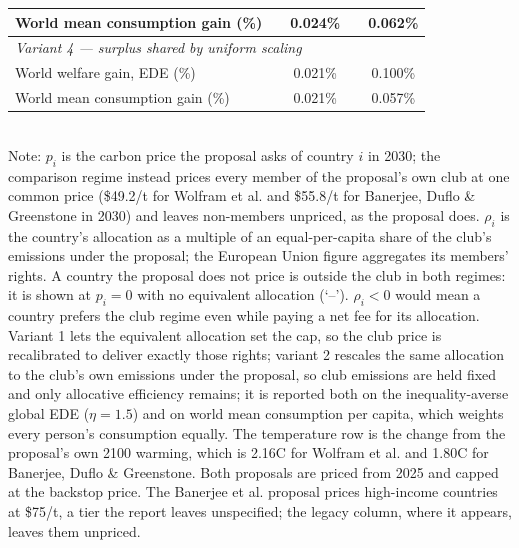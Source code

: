 \begin{table}[htbp]
\begin{tabular}{lcccc}
  \quad World mean consumption gain (\%) &  & 0.024\% &  & 0.062\% \\
  \midrule
  \multicolumn{5}{l}{\textit{Variant 4 --- surplus shared by uniform scaling}} \\
  \quad World welfare gain, EDE (\%) &  & 0.021\% &  & 0.100\% \\
  \quad World mean consumption gain (\%) &  & 0.021\% &  & 0.057\% \\
  \bottomrule
\end{tabular}
\label{tab:equiv_rights_A}
\\[4pt]
{\footnotesize Note: $p_i$ is the carbon price the proposal asks of country $i$ in 2030; the comparison regime instead prices every member of the proposal's own club at one common price (\$49.2/t for Wolfram et al. and \$55.8/t for Banerjee, Duflo \& Greenstone in 2030) and leaves non-members unpriced, as the proposal does. $\rho_i$ is the country's allocation as a multiple of an equal-per-capita share of the club's emissions under the proposal; the European Union figure aggregates its members' rights. A country the proposal does not price is outside the club in both regimes: it is shown at $p_i=0$ with no equivalent allocation (`--'). $\rho_i < 0$ would mean a country prefers the club regime even while paying a net fee for its allocation. Variant 1 lets the equivalent allocation set the cap, so the club price is recalibrated to deliver exactly those rights; variant 2 rescales the same allocation to the club's own emissions under the proposal, so club emissions are held fixed and only allocative efficiency remains; it is reported both on the inequality-averse global EDE ($\eta=1.5$) and on world mean consumption per capita, which weights every person's consumption equally. The temperature row is the change from the proposal's own 2100 warming, which is 2.16\textdegree{}C for Wolfram et al. and 1.80\textdegree{}C for Banerjee, Duflo \& Greenstone. Both proposals are priced from 2025 and capped at the backstop price. The Banerjee et al. proposal prices high-income countries at \$75/t, a tier the report leaves unspecified; the legacy column, where it appears, leaves them unpriced.}
\end{table}
